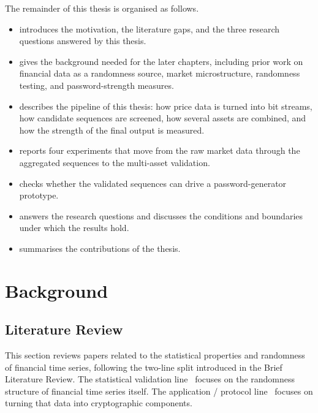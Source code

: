 \documentclass[11pt,titlepage,openany,oneside]{book}  %
\begin{document}
The remainder of this thesis is organised as follows.
\begin{itemize}
\item {} introduces the motivation, the literature gaps, and the three research questions answered by this thesis.
\item {} gives the background needed for the later chapters, including prior work on financial data as a randomness source, market microstructure, randomness testing, and password-strength measures.
\item {} describes the pipeline of this thesis: how price data is turned into bit streams, how candidate sequences are screened, how several assets are combined, and how the strength of the final output is measured.
\item {} reports four experiments that move from the raw market data through the aggregated sequences to the multi-asset validation.
\item {} checks whether the validated sequences can drive a password-generator prototype.
\item {} answers the research questions and discusses the conditions and boundaries under which the results hold.
\item {} summarises the contributions of the thesis.
\end{itemize}

\chapter{Background}
\label{cha:background}

\section{Literature Review}
\label{sec:literature-review}

This section reviews papers related to the statistical properties and randomness of financial time series, following the two-line split introduced in the Brief Literature Review. The statistical validation line~\citep{cont2001stylized,shternshis2025predictability,onofri2025emergence,shternshis2022moscow} focuses on the randomness structure of financial time series itself. The application / protocol line~\citep{clark2010beacon,bonneau2015bitcoin,pierrot2018malleability,chiba2024lfsr,landis2025beacon} focuses on turning that data into cryptographic components.
\end{document}
